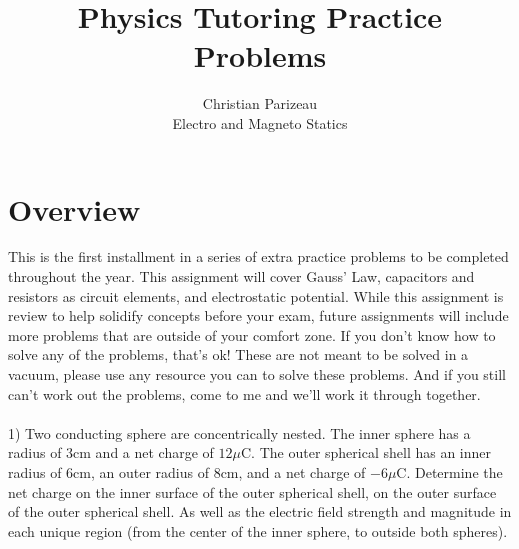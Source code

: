 \documentclass[12pt]{article}
\begin{document}
 
 
 
\title{Physics Tutoring Practice Problems}%
\author{Christian Parizeau\\ %
Electro and Magneto Statics} %
 
\maketitle
\section{Overview}
This is the first installment in a series of extra practice problems to be completed throughout the year. This assignment will cover Gauss' Law, capacitors and resistors as circuit elements, and electrostatic potential. While this assignment is review to help solidify concepts before your exam, future assignments will include more problems that are outside of your comfort zone. If you don't know how to solve any of the problems, that's ok! These are not meant to be solved in a vacuum, please use any resource you can to solve these problems. And if you still can't work out the problems, come to me and we'll work it through together. \\\\
1) Two conducting sphere are concentrically nested. The inner sphere has a radius of $3$cm and a net charge of $12\mu$C. The outer spherical shell has an inner radius of $6$cm, an outer radius of $8$cm, and a net charge of $-6\mu$C. Determine the net  charge on the inner surface of the outer spherical shell, on the outer surface of the outer spherical shell. As well as the electric field strength and magnitude in each unique region (from the center of the inner sphere, to outside both spheres).
\\\\\\\\\\\\\\\\\\\\\\\\\\\\\\\\\\\
\end{document}
